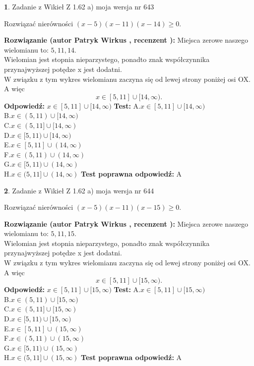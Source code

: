 \documentclass[12pt, a4paper]{article}
\theoremstyle{definition} %
\newtheorem{zad}{}
\newcommand{\zadStart}[1]{\begin{zad}#1\newline}
\newcommand{\zadStop}{\end{zad}}
\newcommand{\rozwStart}[2]{\noindent \textbf{Rozwiązanie (autor #1 , recenzent #2): }\newline}
\newcommand{\rozwStop}{\newline}
\newcommand{\odpStart}{\noindent \textbf{Odpowiedź:}\newline}
\newcommand{\odpStop}{\newline}
\newcommand{\testStart}{\noindent \textbf{Test:}\newline}
\newcommand{\testStop}{\newline}
\newcommand{\kluczStart}{\noindent \textbf{Test poprawna odpowiedź:}\newline}
\newcommand{\kluczStop}{\newline}
\begin{document}
\zadStart{Zadanie z Wikieł Z 1.62 a) moja wersja nr 643}

Rozwiązać nierówności $(x-5)(x-11)(x-14)\ge0$.
\zadStop
\rozwStart{Patryk Wirkus}{}
Miejsca zerowe naszego wielomianu to: $5, 11, 14$.\\
Wielomian jest stopnia nieparzystego, ponadto znak współczynnika przy\linebreak najwyższej potędze x jest dodatni.\\ W związku z tym wykres wielomianu zaczyna się od lewej strony poniżej osi OX. A więc $$x \in [5,11] \cup [14,\infty).$$
\rozwStop
\odpStart
$x \in [5,11] \cup [14,\infty)$
\odpStop
\testStart
A.$x \in [5,11] \cup [14,\infty)$\\
B.$x \in (5,11) \cup [14,\infty)$\\
C.$x \in (5,11] \cup [14,\infty)$\\
D.$x \in [5,11) \cup [14,\infty)$\\
E.$x \in [5,11] \cup (14,\infty)$\\
F.$x \in (5,11) \cup (14,\infty)$\\
G.$x \in [5,11) \cup (14,\infty)$\\
H.$x \in (5,11] \cup (14,\infty)$
\testStop
\kluczStart
A
\kluczStop



\zadStart{Zadanie z Wikieł Z 1.62 a) moja wersja nr 644}

Rozwiązać nierówności $(x-5)(x-11)(x-15)\ge0$.
\zadStop
\rozwStart{Patryk Wirkus}{}
Miejsca zerowe naszego wielomianu to: $5, 11, 15$.\\
Wielomian jest stopnia nieparzystego, ponadto znak współczynnika przy\linebreak najwyższej potędze x jest dodatni.\\ W związku z tym wykres wielomianu zaczyna się od lewej strony poniżej osi OX. A więc $$x \in [5,11] \cup [15,\infty).$$
\rozwStop
\odpStart
$x \in [5,11] \cup [15,\infty)$
\odpStop
\testStart
A.$x \in [5,11] \cup [15,\infty)$\\
B.$x \in (5,11) \cup [15,\infty)$\\
C.$x \in (5,11] \cup [15,\infty)$\\
D.$x \in [5,11) \cup [15,\infty)$\\
E.$x \in [5,11] \cup (15,\infty)$\\
F.$x \in (5,11) \cup (15,\infty)$\\
G.$x \in [5,11) \cup (15,\infty)$\\
H.$x \in (5,11] \cup (15,\infty)$
\testStop
\kluczStart
A
\kluczStop
\end{document}
